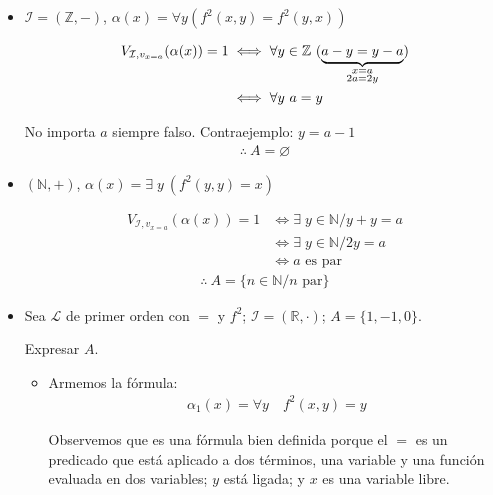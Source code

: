 \begin{itemize}
    \item $\mathcal{I} = (\mathbb{Z}, -)$,
        $\alpha(x) = \forall y (f^2(x,y) = f^2(y,x))$

        \begin{align*}
            V_{\mathcal{I}, v_{x = a}}(\alpha(x)) = 1 
            &\iff
            \forall y \in \mathbb{Z} ~ (\underbrace{a - y = y - a}_{%
            \substack{x = a\\ 2a = 2y}}) \\
            &\iff \forall y ~ a = y
        \end{align*}

        No importa $a$ siempre falso. Contraejemplo: $y = a - 1$
        \begin{gather*}
            \therefore ~ A = \varnothing
        \end{gather*}

    \item $\left(\mathbb{N}, +\right)$,
        $\alpha(x) = \exists \; y ~ (f^2(y,y) = x)$

        \begin{align*}
            V_{\mathcal{I}, v_{x=a}}(\alpha(x)) = 1
            &\iff \exists \; y \in \mathbb{N} / y + y = a\\
            &\iff \exists \; y \in \mathbb{N} / 2 y = a \\
            &\iff a \text{ es par}
        \end{align*}
        \begin{gather*}
            \therefore ~ A = \{ n \in \mathbb{N} / n \text{ par} \}
        \end{gather*}

    \item Sea $\mathcal{L}$ de primer orden con $=$ y $f^2$; 
        $\mathcal{I}=(\mathbb{R}, \cdot)$; $A = \{ 1, -1, 0 \}$.

        Expresar $A$.

        \begin{itemize}
        \item Armemos la fórmula:
        \begin{gather*}
            \alpha_1(x) = \forall y \quad f^2(x,y) = y
        \end{gather*}

        Observemos que es una fórmula bien definida porque el $=$ es un 
        predicado que está aplicado a dos términos, una variable y una 
        función evaluada en dos variables; $y$ está ligada; y $x$ es 
        una variable libre.


\end{itemize}
\end{itemize}
